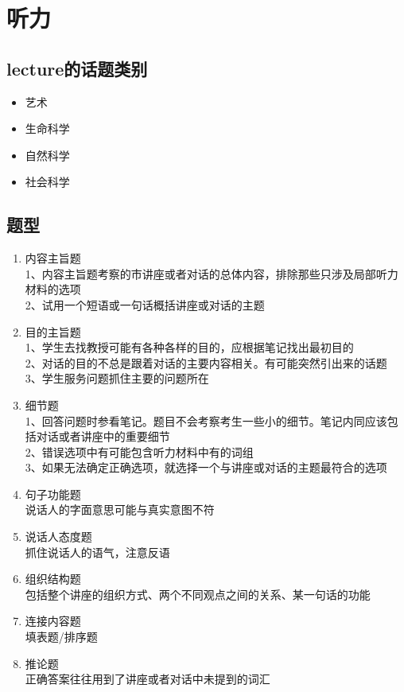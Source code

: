 \documentclass[UTF8]{ctexart}
\begin{document}
\section{听力}
\subsection{lecture的话题类别}
\begin{itemize}
  \item 艺术
  \item 生命科学
  \item 自然科学
  \item 社会科学
\end{itemize}
\subsection{题型}
\begin{enumerate}[A]
\item 内容主旨题\\
1、内容主旨题考察的市讲座或者对话的总体内容，排除那些只涉及局部听力材料的选项\\
2、试用一个短语或一句话概括讲座或对话的主题\\
\item 目的主旨题\\
1、学生去找教授可能有各种各样的目的，应根据笔记找出最初目的\\
2、对话的目的不总是跟着对话的主要内容相关。有可能突然引出来的话题\\
3、学生服务问题抓住主要的问题所在\\
\item 细节题\\
1、回答问题时参看笔记。题目不会考察考生一些小的细节。笔记内同应该包括对话或者讲座中的重要细节\\
2、错误选项中有可能包含听力材料中有的词组\\
3、如果无法确定正确选项，就选择一个与讲座或对话的主题最符合的选项\\
\item 句子功能题\\
说话人的字面意思可能与真实意图不符
\item 说话人态度题\\
抓住说话人的语气，注意反语
\item 组织结构题\\
包括整个讲座的组织方式、两个不同观点之间的关系、某一句话的功能\\
\item 连接内容题\\
填表题/排序题
\item 推论题\\
正确答案往往用到了讲座或者对话中未提到的词汇\\
\end{enumerate}
\end{document}
